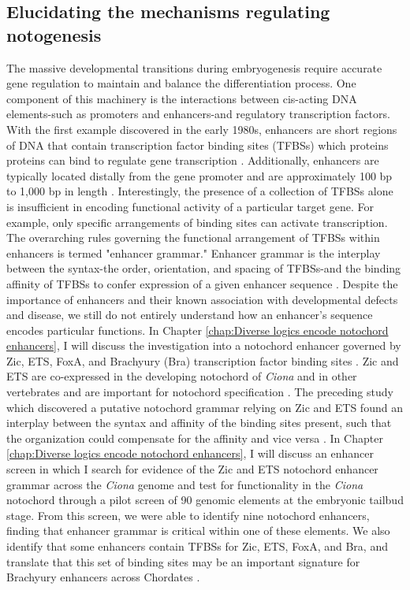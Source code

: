 \begin{dissertationintroduction}
    \section{Elucidating the mechanisms regulating notogenesis}

    The massive developmental transitions during embryogenesis require accurate gene regulation to maintain and balance the differentiation process. One component of this machinery is the interactions between cis-acting DNA elements-such as promoters and enhancers-and regulatory transcription factors. With the first example discovered in the early 1980s, enhancers are short regions of DNA that contain transcription factor binding sites (TFBSs) which proteins proteins can bind to regulate gene transcription \cite{khoury1983, kvon2021, levine2010}. Additionally, enhancers are typically located distally from the gene promoter and are approximately 100 bp to 1,000 bp in length \cite{khoury1983, levine2010}. Interestingly, the presence of a collection of TFBSs alone is insufficient in encoding functional activity of a particular target gene. For example, only specific arrangements of binding sites can activate transcription. The overarching rules governing the functional arrangement of TFBSs within enhancers is termed "enhancer grammar." Enhancer grammar is the interplay between the syntax-the order, orientation, and spacing of TFBSs-and the binding affinity of TFBSs to confer expression of a given enhancer sequence \cite{arnone1997, jindal2021}. Despite the importance of enhancers and their known association with developmental defects and disease, we still do not entirely understand how an enhancer’s sequence encodes particular functions. In Chapter \ref{chap:Diverse logics encode notochord enhancers}, I will discuss the investigation into a notochord enhancer governed by Zic, ETS, FoxA, and Brachyury (Bra) transcription factor binding sites \cite{farley2016, song2022}. Zic and ETS are co-expressed in the developing notochord of \textit{Ciona} and in other vertebrates and are important for notochord specification \cite{dykes2018,matsumoto2007a}. The preceding study which discovered a putative notochord grammar relying on Zic and ETS found an interplay between the syntax and affinity of the binding sites present, such that the organization could compensate for the affinity and vice versa \cite{farley2016}. In Chapter \ref{chap:Diverse logics encode notochord enhancers}, I will discuss an enhancer screen in which I search for evidence of the Zic and ETS notochord enhancer grammar across the \textit{Ciona} genome and test for functionality in the \textit{Ciona} notochord through a pilot screen of 90 genomic elements at the embryonic tailbud stage. From this screen, we were able to identify nine notochord enhancers, finding that enhancer grammar is critical within one of these elements. We also identify that some enhancers contain TFBSs for Zic, ETS, FoxA, and Bra, and translate that this set of binding sites may be an important signature for Brachyury enhancers across Chordates \cite{song2022}. 
    

\end{dissertationintroduction}
